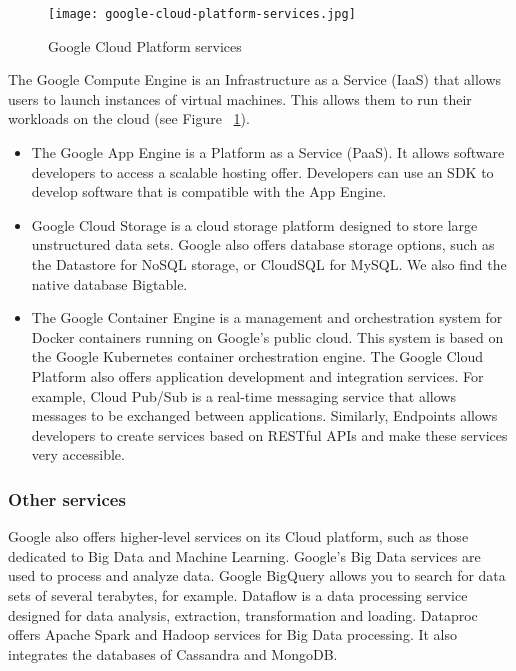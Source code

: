 \begin{figure}[H]
    \centering
    \texttt{[image: google-cloud-platform-services.jpg]}
	\caption{Google Cloud Platform services}
	\label{fig:gcp}
\end{figure}


The Google Compute Engine is an Infrastructure as a Service (IaaS) that allows users to launch instances of virtual machines. This allows them to run their workloads on the cloud (see Figure ~\ref{fig:gcp}).

\begin{itemize}
    \item The Google App Engine is a Platform as a Service (PaaS). It allows software developers to access a scalable hosting offer. Developers can use an SDK to develop software that is compatible with the App Engine.
    \item Google Cloud Storage is a cloud storage platform designed to store large unstructured data sets. Google also offers database storage options, such as the Datastore for NoSQL storage, or CloudSQL for MySQL. We also find the native database Bigtable.
    \item The Google Container Engine is a management and orchestration system for Docker containers running on Google's public cloud. This system is based on the Google Kubernetes container orchestration engine.
The Google Cloud Platform also offers application development and integration services. For example, Cloud Pub/Sub is a real-time messaging service that allows messages to be exchanged between applications. Similarly, Endpoints allows developers to create services based on RESTful APIs and make these services very accessible.
\end{itemize}


\subsubsection{Other services}

Google also offers higher-level services on its Cloud platform, such as those dedicated to Big Data and Machine Learning. Google's Big Data services are used to process and analyze data. Google BigQuery allows you to search for data sets of several terabytes, for example. Dataflow is a data processing service designed for data analysis, extraction, transformation and loading. Dataproc offers Apache Spark and Hadoop services for Big Data processing. It also integrates the databases of Cassandra and MongoDB.


